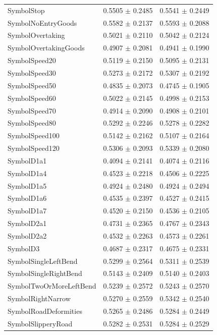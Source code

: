 \begin{longtable}{@{}lrr@{}}
SymbolStop & 0.5505 $\pm$ 0.2485 & 0.5541 $\pm$ 0.2449 \\
SymbolNoEntryGoods & 0.5582 $\pm$ 0.2137 & 0.5593 $\pm$ 0.2088 \\
SymbolOvertaking & 0.5021 $\pm$ 0.2110 & 0.5042 $\pm$ 0.2124 \\
SymbolOvertakingGoods & 0.4907 $\pm$ 0.2081 & 0.4941 $\pm$ 0.1990 \\
SymbolSpeed20 & 0.5119 $\pm$ 0.2150 & 0.5095 $\pm$ 0.2131 \\
SymbolSpeed30 & 0.5273 $\pm$ 0.2172 & 0.5307 $\pm$ 0.2192 \\
SymbolSpeed50 & 0.4835 $\pm$ 0.2073 & 0.4745 $\pm$ 0.1905 \\
SymbolSpeed60 & 0.5022 $\pm$ 0.2145 & 0.4998 $\pm$ 0.2153 \\
SymbolSpeed70 & 0.4914 $\pm$ 0.2090 & 0.4908 $\pm$ 0.2101 \\
SymbolSpeed80 & 0.5292 $\pm$ 0.2246 & 0.5278 $\pm$ 0.2282 \\
SymbolSpeed100 & 0.5142 $\pm$ 0.2162 & 0.5107 $\pm$ 0.2164 \\
SymbolSpeed120 & 0.5306 $\pm$ 0.2093 & 0.5339 $\pm$ 0.2080 \\
SymbolD1a1 & 0.4094 $\pm$ 0.2141 & 0.4074 $\pm$ 0.2116 \\
SymbolD1a4 & 0.4523 $\pm$ 0.2218 & 0.4506 $\pm$ 0.2225 \\
SymbolD1a5 & 0.4924 $\pm$ 0.2480 & 0.4924 $\pm$ 0.2494 \\
SymbolD1a6 & 0.4535 $\pm$ 0.2397 & 0.4527 $\pm$ 0.2415 \\
SymbolD1a7 & 0.4520 $\pm$ 0.2150 & 0.4536 $\pm$ 0.2105 \\
SymbolD2a1 & 0.4731 $\pm$ 0.2365 & 0.4767 $\pm$ 0.2343 \\
SymbolD2a2 & 0.4532 $\pm$ 0.2263 & 0.4573 $\pm$ 0.2261 \\
SymbolD3 & 0.4687 $\pm$ 0.2317 & 0.4675 $\pm$ 0.2331 \\
SymbolSingleLeftBend & 0.5299 $\pm$ 0.2564 & 0.5311 $\pm$ 0.2539 \\
SymbolSingleRightBend & 0.5143 $\pm$ 0.2409 & 0.5140 $\pm$ 0.2403 \\
SymbolTwoOrMoreLeftBend & 0.5239 $\pm$ 0.2572 & 0.5243 $\pm$ 0.2570 \\
SymbolRightNarrow & 0.5270 $\pm$ 0.2559 & 0.5342 $\pm$ 0.2540 \\
SymbolRoadDeformities & 0.5265 $\pm$ 0.2486 & 0.5284 $\pm$ 0.2449 \\
SymbolSlipperyRoad & 0.5282 $\pm$ 0.2531 & 0.5284 $\pm$ 0.2529 \\

\end{longtable}
